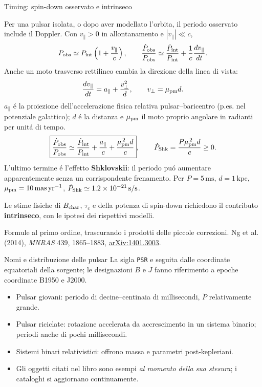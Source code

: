 \begin{frame}[t]{Timing: spin-down osservato e intrinseco}
\vspace*{3mm}
\small\raggedright
Per una pulsar isolata, o dopo aver modellato l'orbita,
il periodo osservato include il Doppler.
Con $v_\parallel>0$ in allontanamento e $|v_\parallel|\ll c$,
\[
P_{\rm obs}\simeq P_{\rm int}\left(1+\frac{v_\parallel}{c}\right),
\qquad
\frac{\dot P_{\rm obs}}{P_{\rm obs}}
\simeq\frac{\dot P_{\rm int}}{P_{\rm int}}+
\frac1c\frac{dv_\parallel}{dt}.
\]
Anche un moto trasverso rettilineo cambia la direzione della linea di vista:
\[
\frac{dv_\parallel}{dt}=a_\parallel+\frac{v_\perp^2}{d},
\qquad v_\perp=\mu_{\rm pm}d.
\]
$a_\parallel$ \'e la proiezione dell'accelerazione fisica relativa pulsar--baricentro
(p.es. nel potenziale galattico); $d$ \'e la distanza e
$\mu_{\rm pm}$ il moto proprio angolare in radianti per unit\'a di tempo.
\[
\boxed{\frac{\dot P_{\rm obs}}{P_{\rm obs}}\simeq
\frac{\dot P_{\rm int}}{P_{\rm int}}
+\frac{a_\parallel}{c}+\frac{\mu_{\rm pm}^{\,2}d}{c}},
\qquad
\dot P_{\rm Shk}=\frac{P\mu_{\rm pm}^{\,2}d}{c}\geq0.
\]
L'ultimo termine \'e l'effetto \textbf{Shklovskii}:
il periodo pu\'o aumentare apparentemente senza un corrispondente frenamento.
Per $P=5\,\mathrm{ms}$, $d=1\,\mathrm{kpc}$,
$\mu_{\rm pm}=10\,\mathrm{mas\,yr^{-1}}$,
$\dot P_{\rm Shk}\simeq1.2\times10^{-21}\,\mathrm{s/s}$.
\par\smallskip
Le stime fisiche di $B_{\rm char}$, $\tau_c$ e della potenza di spin-down
richiedono il contributo \textbf{intrinseco}, con le ipotesi dei rispettivi modelli.
\par\smallskip
\footnotesize
Formule al primo ordine, trascurando i prodotti delle piccole correzioni.
Ng et al. (2014), \emph{MNRAS} 439, 1865--1883,
\href{https://arxiv.org/abs/1401.3003}{arXiv:1401.3003}.
\end{frame}

\begin{frame}[t]{Nomi e distribuzione delle pulsar}
\small
La sigla \texttt{PSR} e seguita dalle coordinate equatoriali della sorgente; le designazioni $B$ e $J$ fanno riferimento a epoche coordinate B1950 e J2000.
\begin{itemize}
\item Pulsar giovani: periodo di decine--centinaia di millisecondi, $\dot P$ relativamente grande.
\item Pulsar riciclate: rotazione accelerata da accrescimento in un sistema binario; periodi anche di pochi millisecondi.
\item Sistemi binari relativistici: offrono massa e parametri post-kepleriani.
\item Gli oggetti citati nel libro sono esempi \emph{al momento della sua stesura}; i cataloghi si aggiornano continuamente.
\end{itemize}
\end{frame}

